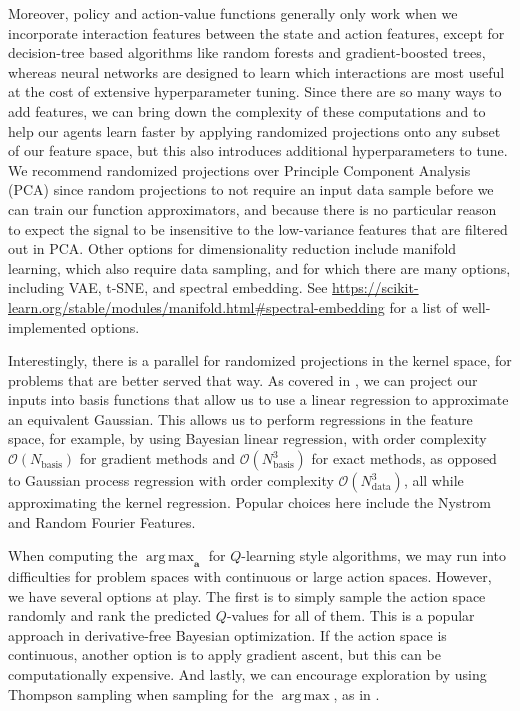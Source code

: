 \documentclass{article}
\DeclareMathOperator*{\argmax}{arg\,max}
\begin{document}
Moreover, policy and action-value functions generally only work when we incorporate interaction features between the state and action features, except for decision-tree based algorithms like random forests and gradient-boosted trees, whereas neural networks are designed to learn which interactions are most useful at the cost of extensive hyperparameter tuning. Since there are so many ways to add features, we can bring down the complexity of these computations and to help our agents learn faster by applying randomized projections onto any subset of our feature space, but this also introduces additional hyperparameters to tune. We recommend randomized projections over Principle Component Analysis (PCA) since random projections to not require an input data sample before we can train our function approximators, and because there is no particular reason to expect the signal to be insensitive to the low-variance features that are filtered out in PCA. Other options for dimensionality reduction include manifold learning, which also require data sampling, and for which there are many options, including VAE, t-SNE, and spectral embedding. See \url{https://scikit-learn.org/stable/modules/manifold.html#spectral-embedding} for a list of well-implemented options.

Interestingly, there is a parallel for randomized projections in the kernel space, for problems that are better served that way. As covered in \cite{GP_BLR}, we can project our inputs into basis functions that allow us to use a linear regression to approximate an equivalent Gaussian. This allows us to perform regressions in the feature space, for example, by using Bayesian linear regression, with order complexity $\mathcal{O}(N_\text{basis})$ for gradient methods and  $\mathcal{O}(N_\text{basis}^3)$ for exact methods, as opposed to Gaussian process regression with order complexity $\mathcal{O}(N_\text{data}^3)$, all while approximating the kernel regression. Popular choices here include the Nystrom and Random Fourier Features.

When computing the $\argmax_\mathbf{a}$ for $Q$-learning style algorithms, we may run into difficulties for problem spaces with continuous or large action spaces. However, we have several options at play. The first is to simply sample the action space randomly and rank the predicted $Q$-values for all of them. This is a popular approach in derivative-free Bayesian optimization. If the action space is continuous, another option is to apply gradient ascent, but this can be computationally expensive. And lastly, we can encourage exploration by using Thompson sampling when sampling for the $\argmax$, as in \cite{RLSVI}.
\end{document}
